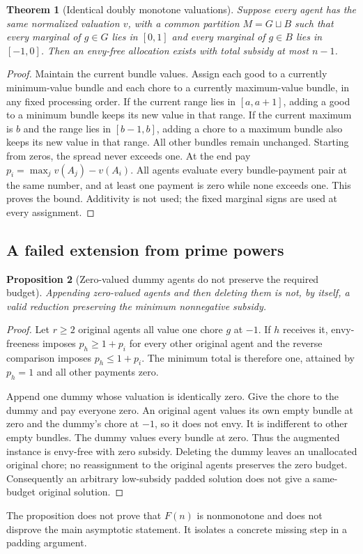 \documentclass[11pt,a4paper]{article}
\newtheorem{theorem}{Theorem}[section]
\newtheorem{proposition}[theorem]{Proposition}
\theoremstyle{remark}\newtheorem{remark}[theorem]{Remark}
\begin{document}
\begin{theorem}[Identical doubly monotone valuations]\label{thm:dmono}
Suppose every agent has the same normalized valuation $v$, with a common partition $M=G\sqcup B$ such that every marginal of $g\in G$ lies in $[0,1]$ and every marginal of $g\in B$ lies in $[-1,0]$. Then an envy-free allocation exists with total subsidy at most $n-1$.
\end{theorem}
\begin{proof}
Maintain the current bundle values. Assign each good to a currently minimum-value bundle and each chore to a currently maximum-value bundle, in any fixed processing order. If the current range lies in $[a,a+1]$, adding a good to a minimum bundle keeps its new value in that range. If the current maximum is $b$ and the range lies in $[b-1,b]$, adding a chore to a maximum bundle also keeps its new value in that range. All other bundles remain unchanged. Starting from zeros, the spread never exceeds one. At the end pay $p_i=\max_jv(A_j)-v(A_i)$. All agents evaluate every bundle-payment pair at the same number, and at least one payment is zero while none exceeds one. This proves the bound. Additivity is not used; the fixed marginal signs are used at every assignment.
\end{proof}

\subsection{A failed extension from prime powers}
\begin{proposition}[Zero-valued dummy agents do not preserve the required budget]\label{prop:dummy}
Appending zero-valued agents and then deleting them is not, by itself, a valid reduction preserving the minimum nonnegative subsidy.
\end{proposition}
\begin{proof}
Let $r\ge2$ original agents all value one chore $g$ at $-1$. If $h$ receives it, envy-freeness imposes $p_h\ge1+p_i$ for every other original agent and the reverse comparison imposes $p_h\le1+p_i$. The minimum total is therefore one, attained by $p_h=1$ and all other payments zero.

Append one dummy whose valuation is identically zero. Give the chore to the dummy and pay everyone zero. An original agent values its own empty bundle at zero and the dummy's chore at $-1$, so it does not envy. It is indifferent to other empty bundles. The dummy values every bundle at zero. Thus the augmented instance is envy-free with zero subsidy. Deleting the dummy leaves an unallocated original chore; no reassignment to the original agents preserves the zero budget. Consequently an arbitrary low-subsidy padded solution does not give a same-budget original solution.
\end{proof}
The proposition does not prove that $F(n)$ is nonmonotone and does not disprove the main asymptotic statement. It isolates a concrete missing step in a padding argument.
\end{document}
